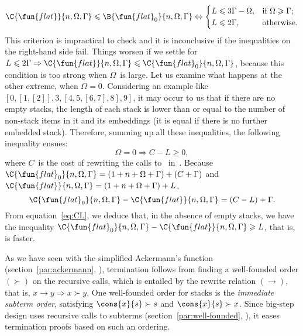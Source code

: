 \begin{equation*}
\C{\fun{flat}}{n,\Omega,\Gamma}
\leqslant
\B{\fun{flat}_0}{n,\Omega,\Gamma}
\Leftrightarrow
\begin{cases}
  L \leqslant 3\Gamma - \Omega,
                         & \text{if \(\Omega \geqslant \Gamma\)};\\
  L \leqslant 2\Gamma,   & \text{otherwise.}
\end{cases}
\end{equation*}
 This criterion is impractical to check and
it is inconclusive if the inequalities on the right\hyp{}hand side
fail. Things worsen if we settle for \(L \leqslant 2\Gamma \Rightarrow
\smash[t]{\C{\fun{flat}}{n,\Omega,\Gamma}} \leqslant
\smash[t]{\C{\fun{flat}_0}{n,\Omega,\Gamma}}\), because this condition
is too strong when \(\Omega\)~is large. Let us examine what happens at
the other extreme, when \(\Omega = 0\). Considering an example like
\([0,[1,[2]],3,[4,5,[6,7],8],9]\), it may occur to us that if there
are no empty stacks, the length of each stack is lower than or equal
to the number of non\hyp{}stack items in it and its embeddings (it is
equal if there is no further embedded stack). Therefore, summing up
all these inequalities, the following inequality ensues:
\begin{equation}
  \Omega = 0 \Rightarrow C - L \geqslant 0, \label{eq:CL}
\end{equation}
where \(C\)~is the cost of rewriting the calls
to~
in~. Because
\(\C{\smash{\fun{flat}_0}}{n,\Omega,\Gamma} = (1 + n + \Omega +
\Gamma) + (C + \Gamma)\) and \(\C{\fun{flat}}{n,\Omega,\Gamma} = (1 +
n + \Omega + \Gamma) + L\),
\begin{equation*}
  \C{\smash{\fun{flat}_0}}{n,\Omega,\Gamma} -
  \C{\fun{flat}}{n,\Omega,\Gamma} =
  (C - L) + \Gamma.
\end{equation*}
From equation~\eqref{eq:CL}, we deduce that, in the absence of empty
stacks, we have the inequality
\(\C{\smash{\fun{flat}_0}}{n,\Omega,\Gamma} -
\C{\fun{flat}}{n,\Omega,\Gamma} \geqslant L\), that is,
 is faster.


\label{flattening:termination}

As we have seen with the simplified Ackermann's function
(section~\ref{par:ackermann}, ), termination
follows from finding a well\hyp{}founded order \((\succ)\) on the
recursive calls, which is entailed by the rewrite relation
\((\rightarrow)\), that is, \(x \rightarrow y \Rightarrow x \succ
y\). One well\hyp{}founded order for stacks is the \emph{immediate
  subterm order}, satisfying \(\cons{x}{s} \succ s\) and \(\cons{x}{s}
\succ x\). Since big\hyp{}step design uses recursive calls to subterms
(section~\ref{par:well-founded}, ), it
eases termination proofs based on such an ordering.


